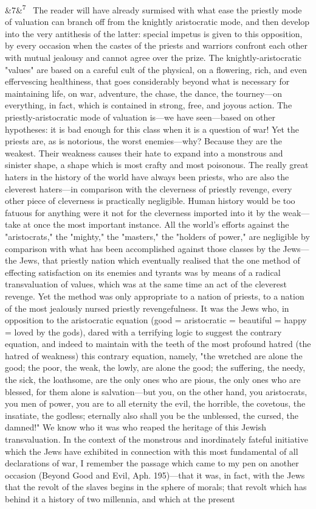 \documentclass[12pt]{article}
\newcommand{\para}[1][]{\par\noindent\ifx&#1&\else\textsuperscript{\footnotesize #1}~\fi}
\begin{document}
\para[7] The reader will have already surmised with what ease the priestly mode of valuation can branch off from the knightly aristocratic mode, and then develop into the very antithesis of the latter: special impetus is given to this opposition, by every occasion when the castes of the priests and warriors confront each other with mutual jealousy and cannot agree over the prize. The knightly-aristocratic "values" are based on a careful cult of the physical, on a flowering, rich, and even effervescing healthiness, that goes considerably beyond what is necessary for maintaining life, on war, adventure, the chase, the dance, the tourney---on everything, in fact, which is contained in strong, free, and joyous action. The priestly-aristocratic mode of valuation is---we have seen---based on other hypotheses: it is bad enough for this class when it is a question of war! Yet the priests are, as is notorious, the worst enemies---why? Because they are the weakest. Their weakness causes their hate to expand into a monstrous and sinister shape, a shape which is most crafty and most poisonous. The really great haters in the history of the world have always been priests, who are also the cleverest haters---in comparison with the cleverness of priestly revenge, every other piece of cleverness is practically negligible. Human history would be too fatuous for anything were it not for the cleverness imported into it by the weak---take at once the most important instance. All the world's efforts against the "aristocrats," the "mighty," the "masters," the "holders of power," are negligible by comparison with what has been accomplished against those classes by the Jews---the Jews, that priestly nation which eventually realised that the one method of effecting satisfaction on its enemies and tyrants was by means of a radical transvaluation of values, which was at the same time an act of the cleverest revenge. Yet the method was only appropriate to a nation of priests, to a nation of the most jealously nursed priestly revengefulness. It was the Jews who, in opposition to the aristocratic equation (good = aristocratic = beautiful = happy = loved by the gods), dared with a terrifying logic to suggest the contrary equation, and indeed to maintain with the teeth of the most profound hatred (the hatred of weakness) this contrary equation, namely, "the wretched are alone the good; the poor, the weak, the lowly, are alone the good; the suffering, the needy, the sick, the loathsome, are the only ones who are pious, the only ones who are blessed, for them alone is salvation---but you, on the other hand, you aristocrats, you men of power, you are to all eternity the evil, the horrible, the covetous, the insatiate, the godless; eternally also shall you be the unblessed, the cursed, the damned!" We know who it was who reaped the heritage of this Jewish transvaluation. In the context of the monstrous and inordinately fateful initiative which the Jews have exhibited in connection with this most fundamental of all declarations of war, I remember the passage which came to my pen on another occasion (Beyond Good and Evil, Aph. 195)---that it was, in fact, with the Jews that the revolt of the slaves begins in the sphere of morals; that revolt which has behind it a history of two millennia, and which at the present 
\end{document}
